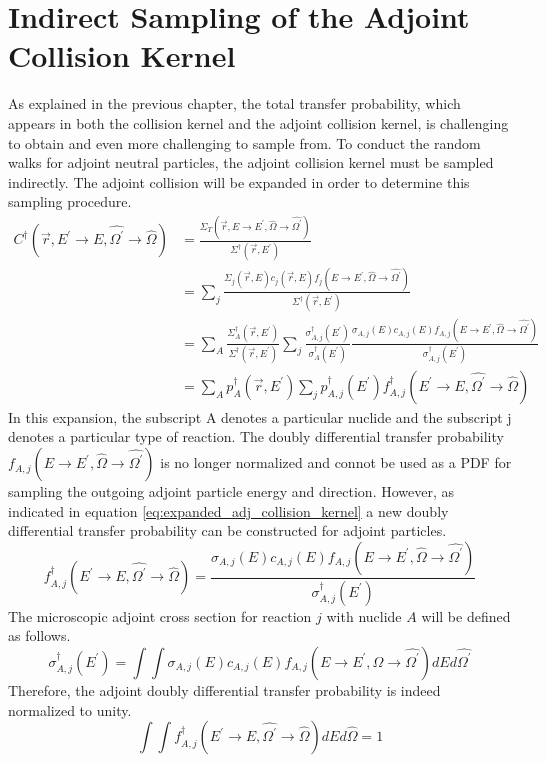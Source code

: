 \section{Indirect Sampling of the Adjoint Collision Kernel}
As explained in the previous chapter, the total transfer probability, which
appears in both the collision kernel and the adjoint collision kernel, is
challenging to obtain and even more challenging to sample from. To conduct
the random walks for adjoint neutral particles, the adjoint collision kernel 
must be sampled indirectly. The adjoint collision will be expanded in order
to determine this sampling procedure. 
\begin{align}
  C^{\dagger}(\vec{r},E^{'} \to E,\hat{\Omega^{'}} \to \hat{\Omega}) & =
  \frac{\Sigma_T(\vec{r},E \to E^{'},\hat{\Omega} \to \hat{\Omega^{'}})}
       {\Sigma^{\dagger}(\vec{r},E^{'})} \nonumber \\
       & = \sum_j 
       \frac{\Sigma_{j}(\vec{r},E)c_j(\vec{r},E)
         f_j(E \to E^{'},\hat{\Omega} \to \hat{\Omega^{'}})}
            {\Sigma^{\dagger}(\vec{r},E^{'})} \nonumber \\
  & = \sum_A \frac{\Sigma_A^{\dagger}(\vec{r},E^{'})}
                  {\Sigma^{\dagger}(\vec{r},E^{'})}
  \sum_j \frac{\sigma_{A,j}^{\dagger}(E^{'})}{\sigma_A^{\dagger}(E^{'})}
  \frac{\sigma_{A,j}(E) c_{A,j}(E) 
        f_{A,j}(E \to E^{'},\hat{\Omega} \to \hat{\Omega^{'}})}
       {\sigma_{A,j}^{\dagger}(E^{'})} \nonumber \\
  & = \sum_A p_A^{\dagger}(\vec{r},E^{'}) \sum_j p_{A,j}^{\dagger}(E^{'})
       f_{A,j}^{\dagger}(E^{'} \to E,\hat{\Omega^{'}} \to \hat{\Omega})
  \label{eq:expanded_adj_collision_kernel}
\end{align}
In this expansion, the subscript A denotes a particular nuclide and the
subscript j denotes a particular type of reaction. The doubly differential
transfer probability $f_{A,j}(E \to E^{'},\hat{\Omega} \to \hat{\Omega^{'}})$
is no longer normalized and connot be used as a PDF for sampling the outgoing
adjoint particle energy and direction. However, as indicated in equation
\ref{eq:expanded_adj_collision_kernel} a new doubly differential transfer
probability can be constructed for adjoint particles. 
\begin{equation}
  f_{A,j}^{\dagger}(E^{'} \to E,\hat{\Omega^{'}} \to \hat{\Omega}) = 
  \frac{\sigma_{A,j}(E)c_{A,j}(E) 
    f_{A,j}(E \to E^{'},\hat{\Omega} \to \hat{\Omega^{'}})}
       {\sigma_{A,j}^{\dagger}(E^{'})}
\end{equation}
The microscopic adjoint cross section for reaction $j$ with nuclide $A$ will
be defined as follows.
\begin{equation}
  \sigma_{A,j}^{\dagger}(E^{'}) = \int\int
  \sigma_{A,j}(E)c_{A,j}(E) 
    f_{A,j}(E \to E^{'},\hat{\Omega} \to \hat{\Omega^{'}}) dE d\hat{\Omega^{'}}
\end{equation}
Therefore, the adjoint doubly differential transfer probability is indeed 
normalized to unity.
\begin{equation}
  \int\int f_{A,j}^{\dagger}(E^{'} \to E,\hat{\Omega^{'}} \to \hat{\Omega})
  dE d\hat{\Omega} = 1
\end{equation}

